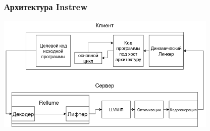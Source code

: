 \documentclass{beamer}
\begin{document}




\begin{frame}[fragile]
  \frametitle{Архитектура Instrew}
  \begin{center}
    \includegraphics[width=300pt]{pictures/instrew.drawio.png}
  \end{center}
\end{frame}
\end{document}
